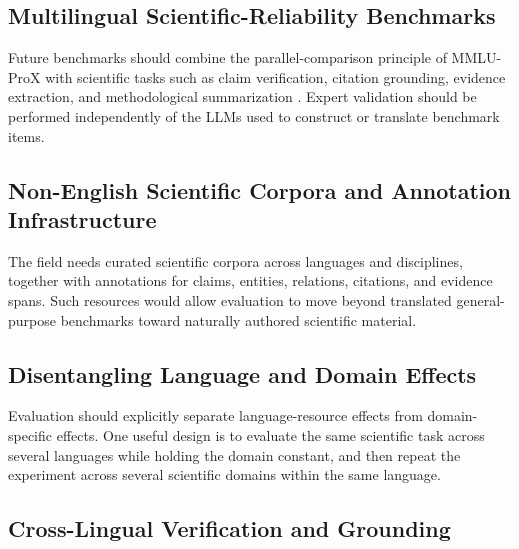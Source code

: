 \documentclass[acmsmall,screen,review]{acmart}
\begin{document}
\subsection{Multilingual Scientific-Reliability Benchmarks}
\label{sec:benchmark-gap}

Future benchmarks should combine the parallel-comparison principle of MMLU-ProX with scientific tasks such as claim verification, citation grounding, evidence extraction, and methodological summarization \citep{xuan2025mmlupro}. Expert validation should be performed independently of the LLMs used to construct or translate benchmark items.


\subsection{Non-English Scientific Corpora and Annotation Infrastructure}
\label{sec:corpus-gap}

The field needs curated scientific corpora across languages and disciplines, together with annotations for claims, entities, relations, citations, and evidence spans. Such resources would allow evaluation to move beyond translated general-purpose benchmarks toward naturally authored scientific material.


\subsection{Disentangling Language and Domain Effects}
\label{sec:disentangle-gap}

Evaluation should explicitly separate language-resource effects from domain-specific effects. One useful design is to evaluate the same scientific task across several languages while holding the domain constant, and then repeat the experiment across several scientific domains within the same language.


\subsection{Cross-Lingual Verification and Grounding}
\label{sec:verification-gap}
\end{document}

